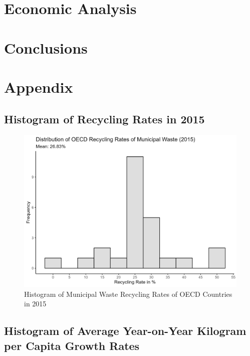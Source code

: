 \documentclass[12pt,a4paper]{article}
\begin{document}
\section{Economic Analysis}


\pagebreak
\section{Conclusions}

\pagebreak
\section{Appendix}
\subsection{Histogram of Recycling Rates in 2015}

\begin{figure}[h]
\centering
\includegraphics[scale=0.65]{../04_figures/hist_recyclingrates.png}
\caption{Histogram of Municipal Waste Recycling Rates of OECD Countries in 2015}
\label{fig:histrecycling}
\end{figure}

\subsection{Histogram of Average Year-on-Year Kilogram per Capita Growth Rates}
\end{document}
